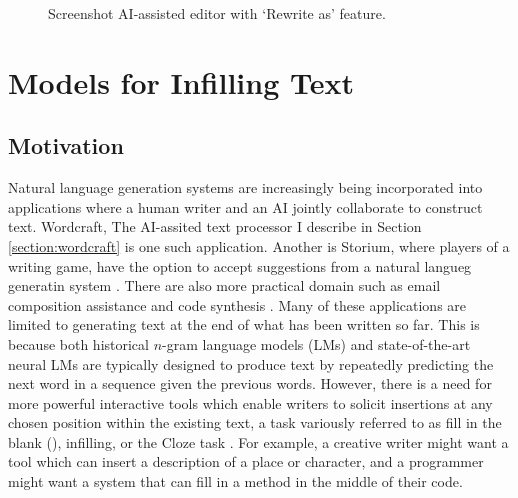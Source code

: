 \begin{figure}[!htb]
  \centering
  \caption{Screenshot AI-assisted editor with `Rewrite as' feature.\label{fig:wc}}
\end{figure} 

\section{Models for Infilling Text}
\label{section:fitb}

\subsection{Motivation}

Natural language generation systems are increasingly being incorporated into applications where a human writer and an AI jointly collaborate to construct text.
Wordcraft, The AI-assited text processor I describe in Section \ref{section:wordcraft} is one such application.
Another is Storium, where players of a writing game, have the option to accept suggestions from a natural langueg generatin system \citep{akoury2020storium}.
There are also more practical domain such as email composition assistance and code synthesis \citep{buschek2021impact,wu2018smart,austin2021program}.
Many of these applications are limited to generating text at the end of what has been written so far.
This is because
both historical $n$-gram language models (LMs) and state-of-the-art neural LMs
are typically designed to produce text by repeatedly predicting the next word in a sequence given the previous words.
However, there is a need for more powerful interactive tools which enable writers to solicit insertions at any chosen position within the existing text, a task variously referred to as fill in the blank (\FitB), infilling, or the Cloze task \citep{taylor1953cloze}.
For example, a creative writer might want a tool which can insert a description of a place or character, and a programmer might want a system that can fill in a method in the middle of their code.

